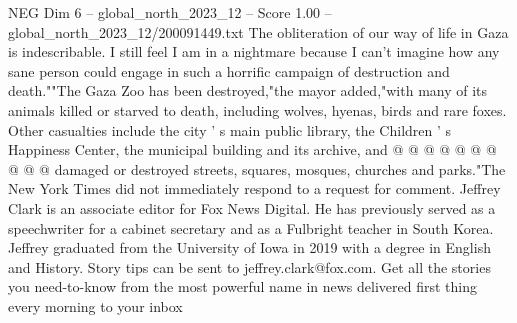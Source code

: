 \begin{textsample}{NEG Dim 6 – global\_north\_2023\_12 – Score 1.00 – global\_north\_2023\_12/200091449.txt}
The obliteration of our way of life in Gaza is indescribable.
I still feel I am in a nightmare because I can't imagine how any sane person could engage in such a horrific campaign of destruction and death.""The Gaza Zoo has been destroyed,"the mayor added,"with many of its animals killed or starved to death, including wolves, hyenas, birds and rare foxes.
Other casualties include the city ' s main public library, the Children ' s Happiness Center, the municipal building and its archive, and @ @ @ @ @ @ @ @ @ @ damaged or destroyed streets, squares, mosques, churches and parks."The New York Times did not immediately respond to a request for comment.
Jeffrey Clark is an associate editor for Fox News Digital.
He has previously served as a speechwriter for a cabinet secretary and as a Fulbright teacher in South Korea.
Jeffrey graduated from the University of Iowa in 2019 with a degree in English and History.
Story tips can be sent to jeffrey.clark@fox.com.
Get all the stories you need-to-know from the most powerful name in news delivered first thing every morning to your inbox

\end{textsample}
